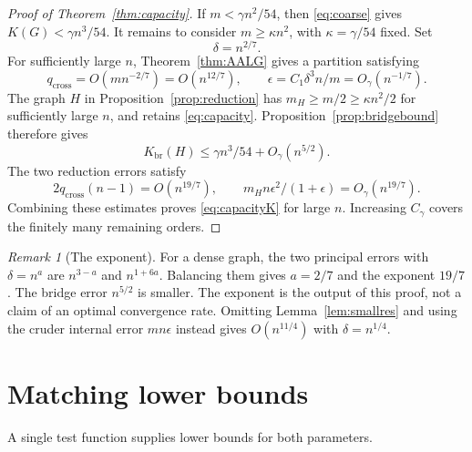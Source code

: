 \documentclass[11pt]{amsart}
\numberwithin{equation}{section}
\theoremstyle{definition}
\theoremstyle{remark}
\newtheorem{remark}[theorem]{Remark}
\newcommand{\Kbr}{K_{\mathrm{br}}}
\begin{document}
\begin{proof}[Proof of Theorem~\ref{thm:capacity}]
If $m<\gamma n^2/54$, then \eqref{eq:coarse} gives $K(G)<\gamma n^3/54$. It remains to consider $m\ge\kappa n^2$, with $\kappa=\gamma/54$ fixed. Set
\begin{equation}\label{eq:delta}
\delta=n^{2/7}.
\end{equation}
For sufficiently large $n$, Theorem~\ref{thm:AALG} gives a partition satisfying
\[
q_{\mathrm{cross}}=O(mn^{-2/7})=O(n^{12/7}),\qquad
\epsilon=C_1\delta^3n/m=O_\gamma(n^{-1/7}).
\]
The graph $H$ in Proposition~\ref{prop:reduction} has $m_H\ge m/2\ge\kappa n^2/2$ for sufficiently large $n$, and retains \eqref{eq:capacity}. Proposition~\ref{prop:bridgebound} therefore gives
\[
\Kbr(H)\le\gamma n^3/54+O_\gamma(n^{5/2}).
\]
The two reduction errors satisfy
\[
2q_{\mathrm{cross}}(n-1)=O(n^{19/7}),\qquad
m_Hn\epsilon^2/(1+\epsilon)=O_\gamma(n^{19/7}).
\]
Combining these estimates proves \eqref{eq:capacityK} for large $n$. Increasing $C_\gamma$ covers the finitely many remaining orders.
\end{proof}

\begin{remark}[The exponent]\label{rem:rate}
For a dense graph, the two principal errors with $\delta=n^a$ are $n^{3-a}$ and $n^{1+6a}$. Balancing them gives $a=2/7$ and the exponent $19/7$. The bridge error $n^{5/2}$ is smaller. The exponent is the output of this proof, not a claim of an optimal convergence rate. Omitting Lemma~\ref{lem:smallres} and using the cruder internal error $mn\epsilon$ instead gives $O(n^{11/4})$ with $\delta=n^{1/4}$.
\end{remark}

\section{Matching lower bounds}\label{sec:lower}
A single test function supplies lower bounds for both parameters.
\end{document}
